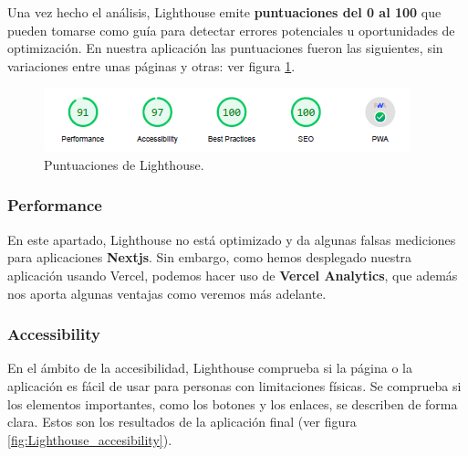 \documentclass[12pt,twoside,titlepage]{report}
\begin{document}
Una vez hecho el análisis, Lighthouse emite \textbf{puntuaciones del 0 al 100} que pueden tomarse como guía para detectar errores potenciales u oportunidades de optimización. En nuestra aplicación las puntuaciones fueron las siguientes, sin variaciones entre unas páginas y otras: ver figura \ref{fig:Lighthouse_resumen}.

\begin{figure}[H]
    \centering
    \includegraphics[scale=1.2]{Lighthouse/Resumen}
    \caption{Puntuaciones de Lighthouse.}
    \label{fig:Lighthouse_resumen}
\end{figure}

\subsubsection{Performance}

En este apartado, Lighthouse no está optimizado y da algunas falsas mediciones para aplicaciones \textbf{Nextjs}. Sin embargo, como hemos desplegado nuestra aplicación usando Vercel, podemos hacer uso de \textbf{Vercel Analytics}, que además nos aporta algunas ventajas como veremos más adelante.

\subsubsection{Accessibility}

En el ámbito de la accesibilidad, Lighthouse comprueba si la página o la aplicación es fácil de usar para personas con limitaciones físicas. Se comprueba si los elementos importantes, como los botones y los enlaces, se describen de forma clara. Estos son los resultados de la aplicación final (ver figura \ref{fig:Lighthouse_accesibility}).
\end{document}
